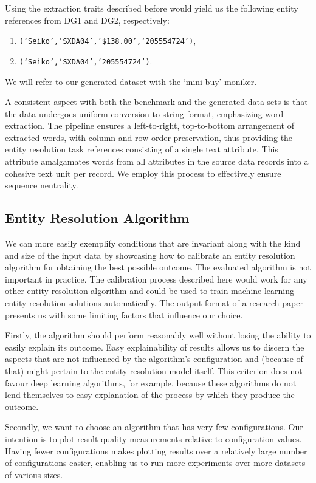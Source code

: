 Using the extraction traits described before would yield us the
following entity references from DG1 and DG2, respectively:
\begin{enumerate}
    \item \texttt{(`Seiko',`SXDA04',`\$138.00',`205554724')},
    \item \texttt{(`Seiko',`SXDA04',`205554724')}.
\end{enumerate}

We will refer to our generated dataset with the `mini-buy' moniker.

A consistent aspect with both the benchmark and the generated data sets is that
the data undergoes uniform conversion to string format, emphasizing word
extraction.
The pipeline ensures a left-to-right, top-to-bottom arrangement of extracted
words, with column and row order preservation, thus providing the entity
resolution task references consisting of a single text attribute.
This attribute amalgamates words from all attributes in the source data records
into a cohesive text unit per record.
We employ this process to effectively ensure sequence neutrality.

\subsection{Entity Resolution Algorithm}\label{subsec:Entity Resolution Algorithm}

We can more easily exemplify conditions that are invariant along with the kind
and size of the input data by showcasing how to calibrate an entity resolution
algorithm for obtaining the best possible outcome.
The evaluated algorithm is not important in practice.
The calibration process described here would work for any other entity
resolution algorithm and could be used to train machine learning entity
resolution solutions automatically.
The output format of a research paper presents us with some limiting factors
that influence our choice.

Firstly, the algorithm should perform reasonably well without losing the ability
to easily explain its outcome.
Easy explainability of results allows us to discern the aspects that are not
influenced by the algorithm's configuration and (because of that) might pertain
to the entity resolution model itself.
This criterion does not favour deep learning algorithms, for example, because
these algorithms do not lend themselves to easy explanation of the process by
which they produce the outcome.

Secondly, we want to choose an algorithm that has very few configurations.
Our intention is to plot result quality measurements relative to configuration
values.
Having fewer configurations makes plotting results over a relatively large
number of configurations easier, enabling us to run more experiments over more
datasets of various sizes.

